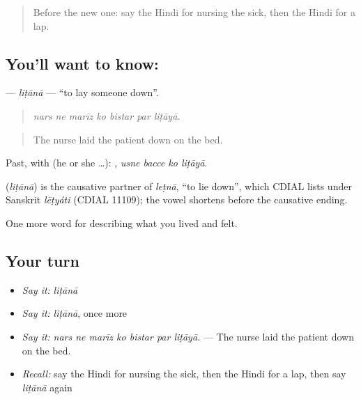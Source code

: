 \label{lesson:HI-C494-litana}



\begin{quote}
Before the new one: say the Hindi for nursing the sick, then the Hindi for a lap.
\end{quote}

\subsection*{You'll want to know: }
\textbf{} — \emph{liṭānā} — \textquotedblleft{}to lay someone down\textquotedblright{}.

\begin{quote}
      
\end{quote}

\begin{quote}
\emph{nars ne marīz ko bistar par liṭāyā.}
\end{quote}

\begin{quote}
The nurse laid the patient down on the bed.
\end{quote}

Past, with  (he or she …):    , \emph{usne bacce ko liṭāyā}.

\begin{cousinweb}
\textbf{} (\emph{liṭānā}) is the causative partner of \emph{leṭnā}, \textquotedblleft{}to lie down\textquotedblright{}, which CDIAL lists under Sanskrit \emph{lēṭyáti} (CDIAL 11109); the vowel shortens before the causative ending.
\end{cousinweb}

\begin{grammarlens}[title={What you've built}]
One more word for describing what you lived and felt.
\end{grammarlens}

\subsection*{Your turn}
\begin{itemize}
\raggedright
  \item \emph{Say it:} \emph{liṭānā}
  \item \emph{Say it:} \emph{liṭānā}, once more
  \item \emph{Say it:} \emph{nars ne marīz ko bistar par liṭāyā.} — The nurse laid the patient down on the bed.
  \item \emph{Recall:} say the Hindi for nursing the sick, then the Hindi for a lap, then say \emph{liṭānā} again
\end{itemize}

